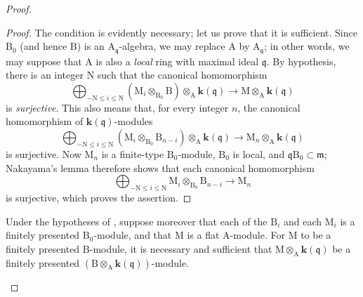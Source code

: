 \begin{proof}

\begin{proof}
The condition is evidently necessary; let us prove that it is
sufficient. Since $\mathrm{B}_0$ (and hence $\mathrm{B}$) is an
$\mathrm{A}_{\mathfrak{q}}$-algebra, we may replace $\mathrm{A}$ by
$\mathrm{A}_{\mathfrak{q}}$; in other words, we may suppose that
$\mathrm{A}$ is also a \emph{local} ring with maximal ideal
$\mathfrak{q}$. By hypothesis, there is an integer $\mathrm{N}$ such
that the canonical homomorphism
\[
 \bigoplus_{-\mathrm{N}\leqslant i\leqslant\mathrm{N}}
   (\mathrm{M}_i\otimes_{\mathrm{B}_0}\mathrm{B})
   \otimes_\mathrm{A}\boldsymbol{k}(\mathfrak{q})
 \longrightarrow
 \mathrm{M}\otimes_\mathrm{A}\boldsymbol{k}(\mathfrak{q})
\]
is \emph{surjective}. This also means that, for every integer $n$, the
canonical homomorphism of $\boldsymbol{k}(\mathfrak{q})$-modules
\[
 \bigoplus_{-\mathrm{N}\leqslant i\leqslant\mathrm{N}}
   (\mathrm{M}_i\otimes_{\mathrm{B}_0}\mathrm{B}_{n-i})
   \otimes_\mathrm{A}\boldsymbol{k}(\mathfrak{q})
 \longrightarrow
 \mathrm{M}_n\otimes_\mathrm{A}\boldsymbol{k}(\mathfrak{q})
\]
is surjective. Now $\mathrm{M}_n$ is a finite-type
$\mathrm{B}_0$-module, $\mathrm{B}_0$ is local, and
$\mathfrak{q}\mathrm{B}_0\subset\mathfrak{m}$; Nakayama's lemma
therefore shows that each canonical homomorphism
\[
 \bigoplus_{-\mathrm{N}\leqslant i\leqslant\mathrm{N}}
   \mathrm{M}_i\otimes_{\mathrm{B}_0}\mathrm{B}_{n-i}
 \longrightarrow \mathrm{M}_n
\]
is surjective, which proves the assertion.
\end{proof}

\begin{corollary}[11.2.9.4]
\label{IV.11.2.9.4}
Under the hypotheses of , suppose moreover that each of the $\mathrm{B}_i$ and each $\mathrm{M}_i$ is a finitely presented $\mathrm{B}_0$-module, and that $\mathrm{M}$ is a flat $\mathrm{A}$-module. For $\mathrm{M}$ to be a finitely presented $\mathrm{B}$-module, it is necessary and sufficient that $\mathrm{M}\otimes_\mathrm{A}\boldsymbol{k}(\mathfrak{q})$ be a finitely presented $(\mathrm{B}\otimes_\mathrm{A}\boldsymbol{k}(\mathfrak{q}))$-module.
\end{corollary}


\end{proof}

